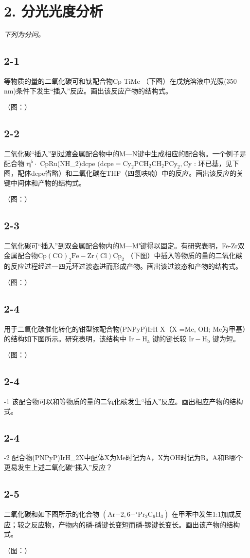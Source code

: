 \section*{2. 分光光度分析}
\textit{下列为分问。}

\subsection*{2-1}
等物质的量的⼆氧化碳可和钛配合物Cp TiMe （下图）在戊烷溶液中光照(350 nm)条件下发⽣“插⼊”反应。画出该反应产物的结构式。

（图：）

\subsection*{2-2}
⼆氧化碳“插⼊”到过渡⾦属配合物中的M—N键中⽣成相应的配合物。⼀个例⼦是配合物 $\boldsymbol \eta ^ { 5 } \cdot$ CpRu(NH_{2})dcpe $\mathrm { ( d c p e = C y _ { 2 } P C H _ { 2 } C H _ { 2 } P C y _ { 2 } , C y }$ : 环已基，⻅下图，配体dcpe省略）和⼆氧化碳在THF（四氢呋喃）中的反应。画出该反应的关键中间体和产物的结构式。

（图：）

\subsection*{2-3}
⼆氧化碳可“插⼊”到双⾦属配合物内的M—M′键得以固定。有研究表明，Fe-Zr双⾦属配合物$\mathrm { C p ( C O ) _ { 2 } F e - Z r ( C l ) C p _ { 2 } }$ （下图）中插⼊等物质的量的⼆氧化碳的反应过程经过⼀四元环过渡态进⽽形成产物。画出该过渡态和产物的结构式。

（图：）

\subsection*{2-4}
⽤于⼆氧化碳催化转化的钳型铱配合物(PNPyP)IrH X（X =Me, OH; Me为甲基）的结构如下图所⽰。研究表明，该结构中 $\mathrm { I r { - } H _ { a } }$ 键的键⻓较 $\mathrm { I r { - } H _ { b } }$ 键为短。

（图：）

\subsection*{2-4}
-1 该配合物可以和等物质的量的⼆氧化碳发⽣“插⼊”反应。画出相应产物的结构式。

\subsection*{2-4}
-2 配合物(PNPyP)IrH_{2}X中配体X为Me时记为A，X为OH时记为B。A和B哪个更易发⽣上述⼆氧化碳“插⼊”反应？

\subsection*{2-5}
⼆氧化碳和如下图所⽰的化合物 $\left( \mathrm { A r { \mathrm { - } } 2 } , 6 { \mathrm { - } } ^ { i } \mathrm { P r } _ { 2 } \mathrm { C } _ { 6 } \mathrm { H } _ { 3 } \right)$ 在甲苯中发⽣1:1加成反应；较之反应物，产物内的磷-磷键⻓变短⽽磷-镓键⻓变⻓。画出该产物的结构式。

（图：）
